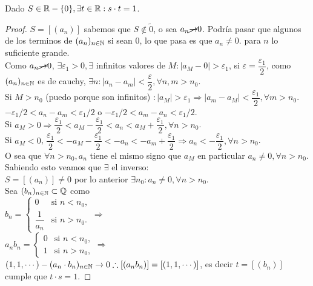 \begin{theorem}
  Dado $S \in \mathbb{R} - \{0\}, \exists t \in \mathbb{R} : s \cdot t = 1$.
  \begin{proof}
    $S = [(a_n)]$ sabemos que $S \notin \tilde{0}$, o sea $a_n \cancel{\to} 0$. Podría pasar que algunos de los terminos de $(a_n)_{n \in \mathbb{N}}$ si sean $0$, lo que pasa es que $a_n \neq 0.$ para $n$ lo suficiente grande. \\
    Como $a_n \cancel{\to} 0$, $\exists \varepsilon_1 > 0, \exists$ infinitos valores de $M: |a_M - 0| > \varepsilon_1$, si $\varepsilon = \dfrac{\varepsilon_1}{2}$, como $(a_n)_{n \in \mathbb{N}}$ es de cauchy, $\exists n : |a_n - a_m| < \dfrac{\varepsilon}{2}, \forall n, m > n_0$. \\
    Si $M > n_0$ (puedo porque son infinitos) $: |a_M| > \varepsilon_1 \Rightarrow |a_m - a_M| < \dfrac{\varepsilon_1}{2}, \forall m > n_0$. \\
    $-\varepsilon_1/2 < a_n - a_m < \varepsilon_1 / 2$ o $-\varepsilon_1 / 2 < a_m - a_n < \varepsilon_1 / 2$. \\ 
    Si $a_M > 0 \Rightarrow \dfrac{\varepsilon_1}{2} < a_M - \dfrac{\varepsilon_1}{2} < a_n < a_M + \dfrac{\varepsilon_1}{2}, \forall n > n_0$. \\
    Si $a_M < 0$, $\dfrac{\varepsilon_1}{2} < -a_M - \dfrac{\varepsilon_1}{2} < -a_n<-a_m+ \dfrac{\varepsilon_1}{2} \Rightarrow a_n < -\dfrac{\varepsilon_1}{2}, \forall n > n_0$. \\
    O sea que $\forall n > n_0, a_n$ tiene el mismo signo que $a_M$ en particular $a_n \neq 0, \forall n > n_0$. \\
    Sabiendo esto veamos que $\exists$ el inverso: \\
    $S = [(a_n)] \neq 0$ por lo anterior $\exists n_0 : a_n \neq 0, \forall n > n_0$. \\
    Sea $(b_n)_{n \in \mathbb{N}} \subset \mathbb{Q}$ como \\
    $b_n = \begin{cases}
      0 & \text{si } n < n_0, \\ 
      \dfrac{1}{a_n} & \text{si } n > n_0.
    \end{cases} \Rightarrow$ \\

    $a_n b_n = \begin{cases}
      0 & \text{si } n < n_0, \\
      1 & \text{si } n > n_0,
    \end{cases} \Rightarrow$ \\

    $(1, 1, \cdots) - (a_n \cdot b_n)_{n \in \mathbb{N}} \to 0 \therefore [(a_n b_n)] = [(1, 1, \cdots)]$, es decir $t = [(b_n)]$ cumple que $t \cdot s = 1$.
  \end{proof}
\end{theorem}

